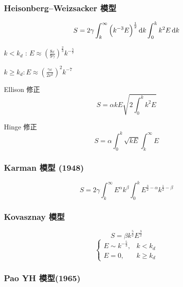 \documentclass[12pt]{ctexart}
\begin{document}
\subsubsection{Heisonberg--Weizsacker 模型}

\begin{equation}
   S = 2\gamma \int_{k}^{\infty} \left( k^{-3} E \right) ^{\frac{1}{2}}\dif k \int_{0}^{k} k^2 E \dif k  
\end{equation}

$k<k_d$ : $E \approx \left( \frac{8\varepsilon}{9\gamma} \right)^{\frac{2}{3}} k^{-\frac{5}{7}} $

$k\ge k_d: E \approx \left( \frac{\gamma\varepsilon}{2\nu^2} \right) ^2 k^{-7}$

Ellison 修正
\begin{equation}
   S = \alpha k E \sqrt{2 \int_{0}^{k} k^2 E } 
\end{equation}

Hinge 修正
\begin{equation}
   S = \alpha \int_{0}^{k}  \sqrt{kE} \int_{k}^{\infty} E  
\end{equation}


\subsubsection{Karman 模型 (1948)}

\begin{equation}
   S = 2\gamma \int_{k}^{\infty} E^{\alpha} k^{\beta} \int_{0}^{k} E^{\frac{3}{2} - \alpha} k^{\frac{1}{2} - \beta}  
\end{equation}


\subsubsection{Kovasznay 模型}

\begin{equation}
   S = \beta k^{\frac{5}{2}} E^{\frac{3}{2}}
\end{equation}
\begin{equation}
   \begin{cases}
	  E \sim k^{-\frac{5}{3}}, & k<k_d\\
	  E = 0, & k\ge k_d
   \end{cases}
\end{equation}


\subsubsection{Pao YH 模型(1965)}
\end{document}
